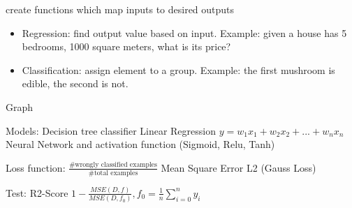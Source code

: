 create functions which map inputs to desired outputs
\begin{itemize}
    \item Regression: find output value based on input. Example: given a house has 5 bedrooms, 1000 square meters, what is its price?
    \item Classification: assign element to a group. Example: the first mushroom is edible, the second is not.
\end{itemize}

Graph

Models:
Decision tree classifier
Linear Regression $y = w_1 x_1 + w_2 x_2 +...+ w_n x_n$
Neural Network and activation function (Sigmoid, Relu, Tanh)

Loss function:
$\frac{\text{\# wrongly classified examples}}{\text{\# total examples}}$
Mean Square Error
L2 (Gauss Loss)

Test:
R2-Score $1 - \frac{MSE(D, f)}{MSE(D, f_0)}, f_0 = \frac{1}{n} \sum_{i = 0}^{n} y_i$